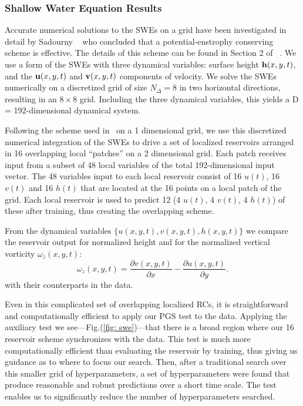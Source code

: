\documentclass[12pt]{article}
\begin{document}
\subsubsection{Shallow Water Equation Results}
Accurate numerical solutions to the SWEs on a grid have been investigated in detail by Sadourny ~\cite{sadourny75} who concluded that a potential-enstrophy conserving scheme is effective. The details of this scheme can be found in Section 2 of ~\cite{sadourny75}. We use a form of the SWEs with three dynamical variables: surface height $\mbox{$\bf{h}$}(x,y,t)$, and the $\mbox{$\bf{u}$}(x,y,t)$ and $\mbox{$\bf{v}$}(x,y,t)$ components of velocity. We solve the SWEs numerically on a discretized grid of size $N_{\Delta} =8$ in two horizontal directions, resulting in an $8 \times 8$ grid. Including the three dynamical variables, this yields a D = 192-dimensional dynamical system. 

Following the scheme used in~\cite{pathak18} on a 1 dimensional grid, we use this discretized numerical integration of the SWEs to drive a set of localized reservoirs arranged in 16 overlapping local ``patches'' on a 2 dimensional grid. Each patch receives input from a subset of 48 local variables of the total 192-dimensional input vector.  The 48 variables input to each local reservoir consist of 16 $u(t)$, 16 $v(t)$ and 16 $h(t)$ that are located at the 16 points on a local patch of the grid. Each local reservoir is used to predict 12 (4 $u(t)$, 4 $v(t)$, 4 $h(t)$) of these after training, thus creating the overlapping scheme.

From the dynamical variables $\{u(x,y,t), v(x,y,t), h(x,y,t)\}$ we compare the reservoir output for normalized height and for the normalized vertical vorticity $\omega_z(x,y,t)$:
\begin{equation}
    \omega_z(x,y,t) = \frac{\partial v(x,y,t)}{\partial x} - \frac{\partial u(x,y,t)}{\partial y}.
\end{equation}
with their counterparts in the data. 

Even in this complicated set of overlapping localized RCs, it is straightforward and computationally efficient to apply our PGS test to the data.  Applying the auxiliary test we see---Fig.(\ref{fig: swe})---that there is a broad region where our 16 reservoir scheme synchronizes with the data.  This test is much more computationally efficient than evaluating the reservoir by training, thus giving us guidance as to where to focus our search.  Then, after a traditional search over this smaller grid of hyperparameters, a set of hyperparameters were found that produce reasonable and robust predictions over a short time scale.  The test enables us to significantly reduce the number of hyperparameters searched. 
\end{document}
